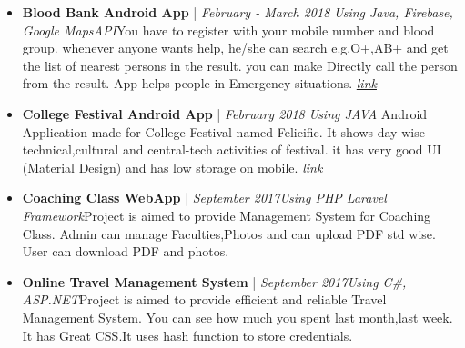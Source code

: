\documentclass[11pt,a4paper,sans]{moderncv}        %
\begin{document}
\begin{itemize}

\item \textbf{Blood Bank Android App} | \textit{February - March 2018} \vspace{3pt}\newline\textit{Using Java, Firebase, Google MapsAPI}\vspace{4pt}\newline \small{You have to register with your mobile number and blood group. whenever anyone wants help, he/she can search e.g.O+,AB+ and get the list of nearest persons in the result. you can make Directly call the person from the result. App helps people in Emergency situations.} \href{https://github.com/denishrana09/BloodBankApp}{\textit{link}}\vspace{6pt}

\newpage

\item{\textbf{College Festival Android App} | \textit{February 2018} \vspace{3pt}\newline\textit{Using JAVA}
\vspace{4pt}\newline
\small{Android Application made for College Festival named Felicific. It shows day wise technical,cultural and central-tech activities of festival. it has very good UI (Material Design) and has low storage on mobile.}}
\href{https://play.google.com/store/apps/details?id=in.opensol.felicific}{\textit{link}}\vspace{6pt}


\item \textbf{Coaching Class WebApp} | \textit{September 2017}\vspace{3pt}\newline\textit{Using PHP Laravel Framework}\vspace{4pt}\newline \small{Project is aimed to provide Management System for Coaching Class. Admin can manage Faculties,Photos and can upload PDF std wise. User can download PDF and photos.} 
\vspace{6pt}

\item \textbf{Online Travel Management System} | \textit{September 2017}\vspace{3pt}\newline\textit{Using C\#, ASP.NET}\vspace{4pt}\newline \small{Project is aimed to provide efficient and reliable Travel Management System. You can see how much you spent last month,last week. It has Great CSS.It uses hash function to store credentials.} 
\end{itemize}
\end{document}
